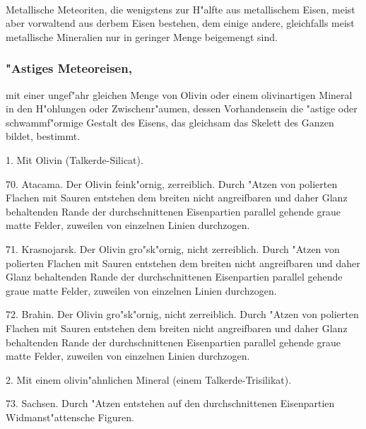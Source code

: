 \documentclass[a4paper, 11pt, oneside, polutonikogreek, german]{article}
\begin{document}
\paragraph{}
Metallische Meteoriten, die wenigstens zur H"alfte aus metallischem Eisen, meist aber vorwaltend aus derbem Eisen bestehen, dem einige andere, gleichfalls meist metallische Mineralien nur in geringer Menge beigemengt sind.
\subsubsection["Astiges Meteoreisen.]{"Astiges Meteoreisen,}
mit einer ungef"ahr gleichen Menge von Olivin oder einem olivinartigen Mineral in den H"ohlungen oder Zwischenr"aumen, dessen Vorhandensein die "astige oder schwammf"ormige Gestalt des Eisens, das gleichsam das Skelett des Ganzen bildet, bestimmt.

\vspace{2ex}

1. Mit Olivin (Talkerde-Silicat).

\vspace{2ex}

70. Atacama. Der Olivin feink"ornig, zerreiblich. Durch "Atzen von polierten Flachen mit Sauren entstehen dem breiten nicht angreifbaren und daher Glanz behaltenden Rande der durchschnittenen Eisenpartien parallel gehende graue matte Felder, zuweilen von einzelnen Linien durchzogen.

71. Krasnojarsk. Der Olivin gro"sk"ornig, nicht zerreiblich. Durch "Atzen von polierten Flachen mit Sauren entstehen dem breiten nicht angreifbaren und daher Glanz behaltenden Rande der durchschnittenen Eisenpartien parallel gehende graue matte Felder, zuweilen von einzelnen Linien durchzogen.

72. Brahin. Der Olivin gro"sk"ornig, nicht zerreiblich. Durch "Atzen von polierten Flachen mit Sauren entstehen dem breiten nicht angreifbaren und daher Glanz behaltenden Rande der durchschnittenen Eisenpartien parallel gehende graue matte Felder, zuweilen von einzelnen Linien durchzogen.

\vspace{2ex}

2. Mit einem olivin"ahnlichen Mineral (einem Talkerde-Trisilikat).

\vspace{2ex}

73. Sachsen. Durch "Atzen entstehen auf den durchschnittenen Eisenpartien Widmanst"attensche Figuren.
\end{document}
